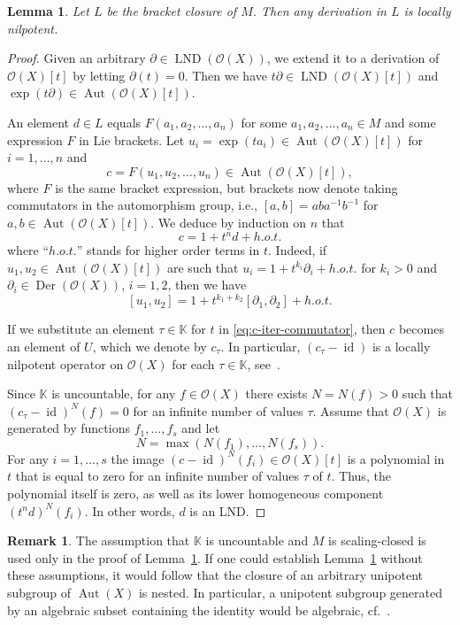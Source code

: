 \documentclass[12pt,a4paper]{amsart}
\theoremstyle{plain}
\newtheorem{lemma}[theorem]{Lemma}
\theoremstyle{definition}
\newtheorem{remark}[theorem]{Remark}
\theoremstyle{remark}
\def\Aut{\operatorname{Aut}}
\def\Der{\operatorname{Der}}
\def\LND{\operatorname{LND}}
\def\K{{\mathbb K}}
\def\cO{{\mathcal O}}
\DeclareMathOperator{\id}{id}
\begin{document}
\begin{lemma}\label{lm:logU-bracket}
   Let $L$ be the bracket closure of $M$.   
   Then any derivation in $L$ is locally nilpotent.
\end{lemma}
\begin{proof} 
   Given an arbitrary $\partial\in\LND(\cO(X))$, we extend it to a derivation of $\cO(X)[t]$ by letting $\partial(t)=0$.
    Then we have $t\partial\in\LND(\cO(X)[t])$ and $\exp(t\partial)\in\Aut(\cO(X)[t])$. 

   
    An element $d\in L$ equals $F(a_1,a_2,\ldots,a_n)$ for some $a_1,a_2,\ldots,a_n\in M$ and some  expression $F$ in Lie brackets. Let $u_i=\exp(ta_i)\in\Aut(\cO(X)[t])$ for $i=1,\ldots,n$ and
    \begin{equation}\label{eq:c-iter-commutator}
      c=F(u_1,u_2,\ldots,u_n)\in \Aut(\cO(X)[t]),
    \end{equation}
    where $F$ is the same bracket expression, but brackets now denote taking commutators in the automorphism group, i.e., $[a,b]=aba^{-1}b^{-1}$ for $a,b\in\Aut(\cO(X)[t]).$ 
    We deduce by induction on $n$ that 
   \[
      c = 1+t^n d + h.o.t.
   \]
    where ``$h.o.t.$'' stands for higher order terms in $t$.
   Indeed, if $u_1,u_2\in\Aut(\cO(X)[t])$ are such that $u_i=1+t^{k_i}\partial_i+ h.o.t.$ 
   for $k_i>0$ and $\partial_i\in\Der(\cO(X))$, $i=1,2$, then we have
   \[
      [u_1,u_2] =1+ t^{k_1+k_2}[\partial_1,\partial_2]+h.o.t.
   \]

   
   If we substitute an element $\tau\in\K$ for $t$ in \eqref{eq:c-iter-commutator}, then $c$ becomes an element of $U$, which we denote by $c_\tau$. 
   In particular, $(c_\tau-\id)$ is a locally nilpotent operator on $\cO(X)$ for each $\tau\in\K$, see~\cite[Proposition~2.1.3]{Essen2000}. 
   
   Since $\K$ is uncountable,
    for any $f\in\cO(X)$ there exists $N=N(f)>0$ such that  $(c_\tau-\id)^N(f)=0$ for an infinite number of values $\tau$.
   Assume that $\cO(X)$ is generated by functions $f_1,\ldots,f_s$ and let 
   \[N=\max(N(f_1),\ldots,N(f_s)).\] 
   For any $i=1,\ldots,s$ the image $(c-\id)^N(f_i)\in\cO(X)[t]$ is a polynomial in $t$ that is equal to zero for an infinite number of values $\tau$ of $t$.
   Thus, the polynomial itself is zero, as well as its lower homogeneous component $(t^nd)^N(f_i)$. In other words, $d$ is an LND.
\end{proof}

\begin{remark}
The assumption that $\K$ is uncountable and $M$ is scaling-closed is used only in the proof of Lemma~\ref{lm:logU-bracket}. 
If one could establish Lemma~\ref{lm:logU-bracket} without these assumptions, it would follow that the closure of an arbitrary unipotent subgroup of $\Aut(X)$ is nested. 
In particular, a unipotent subgroup generated by an algebraic subset containing the identity would be algebraic, cf.~\cite{CRX}.
\end{remark}
\end{document}
